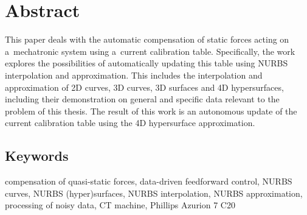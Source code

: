 \section*{Abstract}
This paper deals with the automatic compensation of static forces acting on a~mechatronic system using a~current calibration table. Specifically, the work explores the possibilities of automatically updating this table using NURBS interpolation and approximation. This includes the interpolation and approximation of 2D curves, 3D curves, 3D surfaces and 4D hypersurfaces, including their demonstration on general and specific data relevant to the problem of this thesis. The result of this work is an autonomous update of the current calibration table using the 4D hypersurface approximation.
\subsection*{Keywords}
compensation of quasi-static forces, data-driven feedforward control, NURBS curves, NURBS (hyper)surfaces, NURBS interpolation, NURBS approximation, processing of noisy data, CT machine, Phillips Azurion 7 C20
\restoregeometry
\newpage
